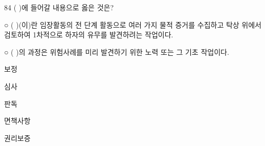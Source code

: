 \begin{question}{84}
( )에 들어갈 내용으로 옳은 것은?
\begin{framedtext}
○ ( )(이)란 임장활동의 전 단계 활동으로 여러 가지 물적 증거를 수집하고 탁상 위에서 검토하여 1차적으로 하자의 유무를 발견하려는 작업이다. \par
○ ( )의 과정은 위험사례를 미리 발견하기 위한 노력 또는 그 기초 작업이다. \par
\end{framedtext}
\begin{choices}
  \item 보정
  \item 심사
  \item 판독
  \item 면책사항
  \item 권리보증
\end{choices}
\end{question}
